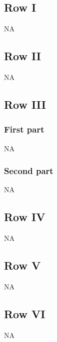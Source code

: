 \documentclass[9pt]{article}
\numberwithin{equation}{section}
\begin{document}
\subsection{Row I}
\textsc{NA}
\subsection{Row II}
\textsc{NA}
 \subsection{Row III}
\subsubsection{First part}
\textsc{NA}
\subsubsection{Second part}
\textsc{NA}
\subsection{Row IV}
\textsc{NA}
\subsection{Row V}
\textsc{NA}
\subsection{Row VI}
\textsc{NA}
\end{document}
